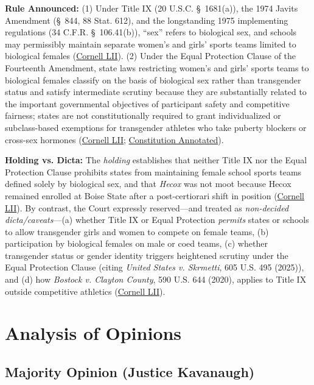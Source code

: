\documentclass[12pt]{article}
\begin{document}
\textbf{Rule Announced:} (1) Under Title IX (20 U.S.C. \S~1681(a)), the 1974 Javits Amendment (\S~844, 88 Stat. 612), and the longstanding 1975 implementing regulations (34 C.F.R. \S~106.41(b)), ``sex'' refers to biological sex, and schools may permissibly maintain separate women's and girls' sports teams limited to biological females (\href{https://www.law.cornell.edu/supremecourt/text/24-43}{Cornell LII}). (2) Under the Equal Protection Clause of the Fourteenth Amendment, state laws restricting women's and girls' sports teams to biological females classify on the basis of biological sex rather than transgender status and satisfy intermediate scrutiny because they are substantially related to the important governmental objectives of participant safety and competitive fairness; states are not constitutionally required to grant individualized or subclass-based exemptions for transgender athletes who take puberty blockers or cross-sex hormones (\href{https://www.law.cornell.edu/supremecourt/text/24-43}{Cornell LII}; \href{https://constitution.congress.gov/browse/essay/intro.9-4-7/ALDE_00000140/}{Constitution Annotated}).

\textbf{Holding vs. Dicta:} The \emph{holding} establishes that neither Title IX nor the Equal Protection Clause prohibits states from maintaining female school sports teams defined solely by biological sex, and that \textit{Hecox} was not moot because Hecox remained enrolled at Boise State after a post-certiorari shift in position (\href{https://www.law.cornell.edu/supremecourt/text/24-43}{Cornell LII}). By contrast, the Court expressly reserved---and treated as \emph{non-decided dicta/caveats}---(a) whether Title IX or Equal Protection \emph{permits} states or schools to allow transgender girls and women to compete on female teams, (b) participation by biological females on male or coed teams, (c) whether transgender status or gender identity triggers heightened scrutiny under the Equal Protection Clause (citing \textit{United States v. Skrmetti}, 605 U.S. 495 (2025)), and (d) how \textit{Bostock v. Clayton County}, 590 U.S. 644 (2020), applies to Title IX outside competitive athletics (\href{https://www.law.cornell.edu/supremecourt/text/24-43}{Cornell LII}).

\section{Analysis of Opinions}

\subsection{Majority Opinion (Justice Kavanaugh)}
\end{document}
